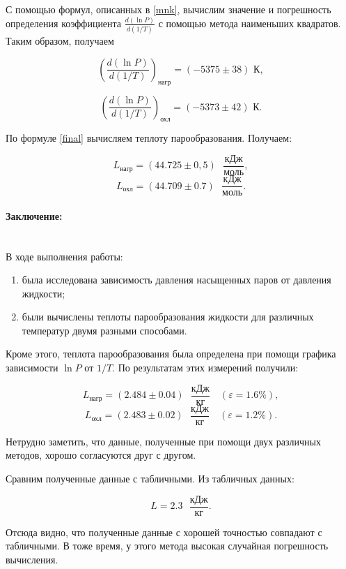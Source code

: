 \documentclass[a4paper, 12pt]{article}
\newcommand{\parag}[1]{\paragraph*{#1:}}
\begin{document}
С помощью формул, описанных в \ref{mnk}, вычислим значение и погрешность определения коэффициента $ \displaystyle \frac{d(\ln P)}{d(1/T)} $ с помощью метода наименьших квадратов. Таким образом, получаем

\[ \left(\frac{d(\ln P)}{d(1/T)}\right)_\text{нагр} = \left(-5375\pm38\right)\text{ К}, \]

\[ \left(\frac{d(\ln P)}{d(1/T)}\right)_\text{охл} = \left(-5373\pm42\right)\text{ К}. \]

По формуле \eqref{final} вычисляем теплоту парообразования. Получаем:

\[ L_\text{нагр} = \left(44.725 \pm 0,5\right) \text{ } \frac{\text{кДж}}{\text{моль}}, \]
\[ L_\text{охл} = \left(44.709 \pm 0.7\right) \text{ } \frac{\text{кДж}}{\text{моль}}. \]


\parag {Заключение} ~\\
В ходе выполнения работы:

\begin{enumerate}
	\item была исследована зависимость давления насыщенных паров от давления жидкости;
	\item были вычислены теплоты парообразования жидкости для различных температур двумя разными способами.
\end{enumerate}

Кроме этого, теплота парообразования была определена при помощи графика зависимости $ \ln P $ от $ 1/T $. По результатам этих измерений получили:

\[L_\text{нагр} = \left(2.484 \pm 0.04\right) \text{ } \frac{\text{кДж}}{\text{кг}} \quad (\varepsilon = 1.6 \%), \]
\[ L_\text{охл} = \left(2.483 \pm 0.02\right) \text{ } \frac{\text{кДж}}{\text{кг}} \quad (\varepsilon = 1.2 \%).  \]


Нетрудно заметить, что данные, полученные при помощи двух различных методов, хорошо согласуются друг с другом.

Сравним полученные данные с табличными. Из табличных данных:

\[ L = 2.3 \text{ } \frac{\text{кДж}}{\text{кг}}. \]

Отсюда видно, что полученные данные с хорошей точностью совпадают с табличными. В тоже время, у этого метода высокая случайная погрешность вычисления.
\end{document}
